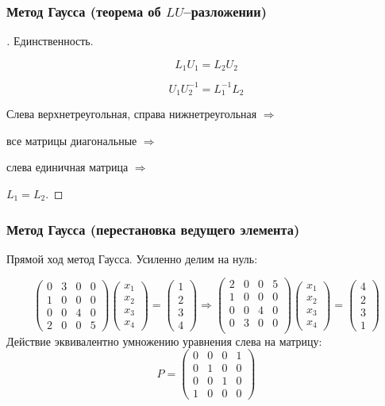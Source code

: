 \documentclass[10pt]{beamer}
\begin{document}
\begin{frame}[fragile]
\frametitle{Метод Гаусса (теорема об $LU$--разложении)}

\begin{proof}[]
Единственность.

$$ L_1 U_1 = L_2 U_2$$

$$ U_1 U_2^{-1} = L_1^{-1} L_2$$

Слева верхнетреугольная, справа нижнетреугольная $\Rightarrow$ 

все матрицы диагональные $\Rightarrow$ 

слева единичная матрица $\Rightarrow$ 

$L_1 = L_2$.

\end{proof}

\end{frame}


\begin{frame}[fragile]
\frametitle{Метод Гаусса (перестановка ведущего элемента)}

Прямой ход метод Гаусса. Усиленно делим на нуль:

$$
\begin{pmatrix}
0 & 3 & 0 & 0 \\
1 & 0 & 0 & 0 \\
0 & 0 & 4 & 0 \\
2 & 0 & 0 & 5 
\end{pmatrix}
\begin{pmatrix}
x_1 \\
x_2 \\
x_3 \\
x_4
\end{pmatrix}
=
\begin{pmatrix}
1 \\
2 \\
3 \\
4
\end{pmatrix}
\Rightarrow
\begin{pmatrix}
2 & 0 & 0 & 5 \\
1 & 0 & 0 & 0 \\
0 & 0 & 4 & 0 \\
0 & 3 & 0 & 0 \\
\end{pmatrix}
\begin{pmatrix}
x_1 \\
x_2 \\
x_3 \\
x_4
\end{pmatrix}
=
\begin{pmatrix}
4 \\
2 \\
3 \\
1
\end{pmatrix}$$
Действие эквивалентно умножению уравнения слева на матрицу:
$$
P = 
\begin{pmatrix}
0 & 0 & 0 & 1 \\
0 & 1 & 0 & 0 \\
0 & 0 & 1 & 0 \\
1 & 0 & 0 & 0 
\end{pmatrix}
$$
\end{frame}
\end{document}
